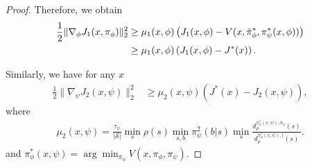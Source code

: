 \documentclass{article}
\theoremstyle{plain}
\theoremstyle{definition}
\theoremstyle{remark}
\def\cS{\mathcal S}
\begin{document}
\begin{proof}
    Therefore, we obtain
    \begin{align}
         \frac{1}{2}\| \nabla_{\phi} J_1(x,\pi_\phi) \|_2^2 
        & \geq\mu_1(x,\phi) \left(J_1(x,\phi) -  V(x,\tilde{\pi}_\phi^*,\pi^*_{\psi}(x,\phi)) \right) \notag \\
        & \geq \mu_1(x,\phi) \left(J_1(x,\phi) -  J^*(x) \right) .
    \end{align}



    Similarly, we have for any $x$
    \begin{align}
         \frac{1}{2}\| \nabla_{\psi} J_2(x,\psi) \|_2^2
        & \geq \mu_2(x,\psi) \left( J^*(x) -  J_2(x,\psi)\right),
    \end{align}
    where 
    \begin{align*}
        \mu_2(x,\psi) = \frac{\tau_\psi}{|\cS|} \min_s \rho(s) \min_{s,b} \pi_\psi^2(b|s) \min_{s} \frac{d^{\pi_\phi^*(x,\psi), \pi_\psi}_{\rho}(s)}{d^{\pi_\phi^*(x,\psi),\dag}_{\rho}(s)}.
    \end{align*}
    and $\pi_\phi^*(x,\psi) = \arg\min_{\pi_\phi} V(x,\pi_\phi,\pi_\psi)$.

\end{proof}
\end{document}

